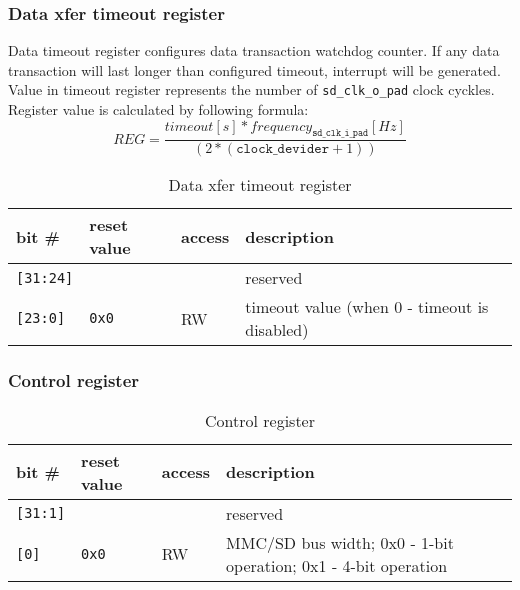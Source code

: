     \subsubsection{Data xfer timeout register}
    \label{sec:data_timeout_reg}
    
    Data timeout register configures data transaction watchdog counter. If any data transaction will last longer than configured timeout, 
    interrupt will be generated. Value in timeout register represents the number of \texttt{sd\_clk\_o\_pad} clock cyckles. 
    Register value is calculated by following formula:
    \begin{equation}
    REG = \frac{timeout[s] * frequency_{\texttt{sd\_clk\_i\_pad}}[Hz]}{(2*(\texttt{clock\_devider} + 1))}
    \end{equation} 
    
    \begin{table}[H]
    \caption{Data xfer timeout register}
        \begin{tabular}{m{1.3cm}|m{2cm}|m{1cm}|m{8cm}}
                \rowcolor[gray]{0.7} bit \# & reset value & access & description \\ \hline \hline
                \texttt{[31:24]} & & & reserved \\ \hline
                \texttt{[23:0]} & \texttt{0x0} & RW & timeout value (when 0 - timeout is disabled) \\ \hline
                \hline
        \end{tabular}
        \label{tab:timeout_reg}
    \end{table}    

    \subsubsection{Control register}
    \label{sec:control_reg}
    
    \begin{table}[H]
    \caption{Control register}
        \begin{tabular}{m{1.3cm}|m{2cm}|m{1cm}|m{8cm}}
                \rowcolor[gray]{0.7} bit \# & reset value & access & description \\ \hline \hline
                \texttt{[31:1]} & & & reserved \\ \hline
                \texttt{[0]} & \texttt{0x0} & RW & MMC/SD bus width; 0x0 - 1-bit operation; 0x1 - 4-bit operation \\ \hline
                \hline
        \end{tabular}
        \label{tab:control_reg}
    \end{table}
    

